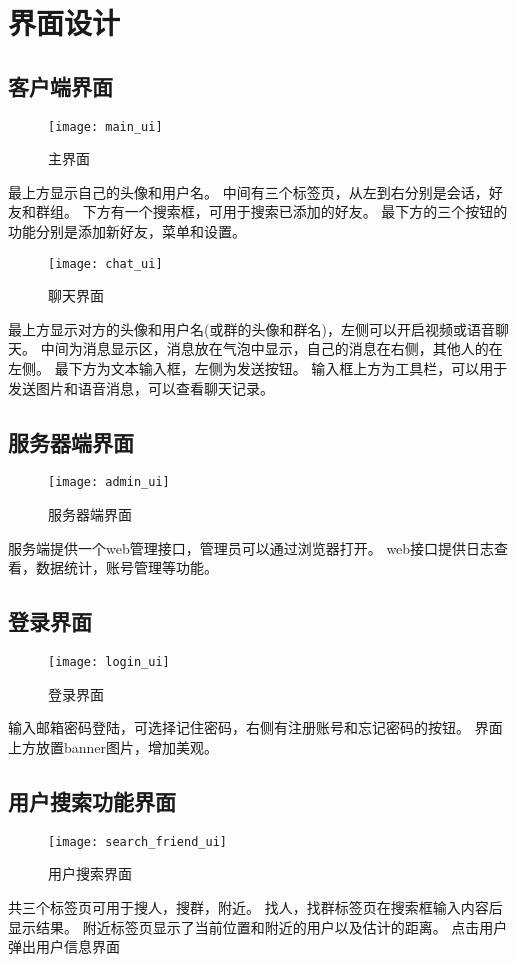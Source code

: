 \chapter{界面设计}
\section{客户端界面}
\begin{figure}[h]
	\centering
	\texttt{[image: main\_ui]}
	\caption{主界面} \label{fig:main_ui}
\end{figure}


最上方显示自己的头像和用户名。
中间有三个标签页，从左到右分别是会话，好友和群组。
下方有一个搜索框，可用于搜索已添加的好友。
最下方的三个按钮的功能分别是添加新好友，菜单和设置。

\begin{figure}[h]
	\centering
	\texttt{[image: chat\_ui]}
	\caption{聊天界面} \label{fig:chat_ui}
\end{figure}


最上方显示对方的头像和用户名(或群的头像和群名)，左侧可以开启视频或语音聊天。
中间为消息显示区，消息放在气泡中显示，自己的消息在右侧，其他人的在左侧。
最下方为文本输入框，左侧为发送按钮。
输入框上方为工具栏，可以用于发送图片和语音消息，可以查看聊天记录。


\section{服务器端界面}

\begin{figure}[h]
	\centering
	\texttt{[image: admin\_ui]}
	\caption{服务器端界面} \label{fig:admin_ui}
\end{figure}

服务端提供一个web管理接口，管理员可以通过浏览器打开。
web接口提供日志查看，数据统计，账号管理等功能。

\section{登录界面}

\begin{figure}[h]
	\centering
	\texttt{[image: login\_ui]}
	\caption{登录界面} \label{fig:login_ui}
\end{figure}

输入邮箱密码登陆，可选择记住密码，右侧有注册账号和忘记密码的按钮。
界面上方放置banner图片，增加美观。

\section{用户搜索功能界面}
\begin{figure}[h]
	\centering
	\texttt{[image: search\_friend\_ui]}
	\caption{用户搜索界面} \label{fig:search_friend_ui}
\end{figure}

共三个标签页可用于搜人，搜群，附近。
找人，找群标签页在搜索框输入内容后显示结果。
附近标签页显示了当前位置和附近的用户以及估计的距离。
点击用户弹出用户信息界面

